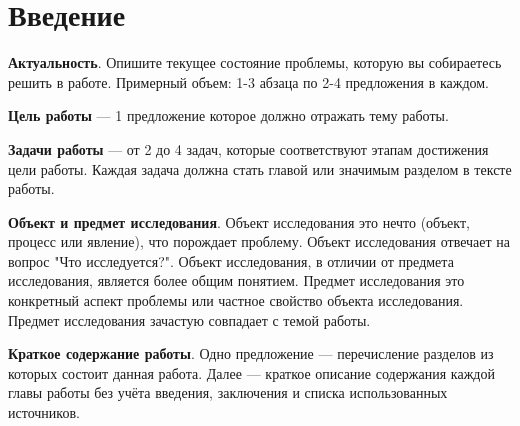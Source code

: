 \section*{Введение}

\textbf{Актуальность}. Опишите текущее состояние проблемы, которую вы собираетесь решить в работе. Примерный объем: 1-3 абзаца по 2-4 предложения в каждом.

\textbf{Цель работы} — 1 предложение которое должно отражать тему работы.

\textbf{Задачи работы} — от 2 до 4 задач, которые соответствуют этапам достижения цели работы. Каждая задача должна стать главой или значимым разделом в тексте работы.

\textbf{Объект и предмет исследования}. Объект исследования это нечто (объект, процесс или явление), что порождает проблему. Объект исследования отвечает на вопрос "Что исследуется?". Объект исследования, в отличии от предмета исследования, является более общим понятием. Предмет исследования это конкретный аспект проблемы или частное свойство объекта исследования. Предмет исследования зачастую совпадает с темой работы.

\textbf{Краткое содержание работы}. Одно предложение — перечисление разделов из которых состоит данная работа. Далее — краткое описание содержания каждой главы работы без учёта введения, заключения и списка использованных источников.
